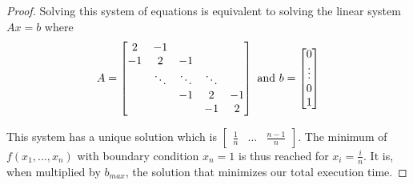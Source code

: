 \documentclass[a4paper,10pt]{article}
\begin{document}
\begin{proof}
  
  Solving this system of equations is equivalent to solving the linear system $Ax=b$ where
  \[ A = \begin{bmatrix}
    2       & -1 &  &  &  \\
    -1       & 2 & -1 &  &  \\
    & \ddots & \ddots & \ddots & \\
    & & -1 & 2 & -1 \\
           &  &  & -1 & 2
\end{bmatrix} \textup{ and } b = \begin{bmatrix} 0 \\ \vdots \\ 0 \\ 1 \end{bmatrix} \]
   
   This system has a unique solution which is $\begin{bmatrix} \frac{1}{n} & \dots & \frac{n-1}{n} \end{bmatrix}$.
   The minimum of $f(x_1,\dots,x_n)$ with boundary condition $x_n=1$ is thus reached for $x_i = \frac{i}{n}$.
   It is, when multiplied by $b_{max}$, the solution that minimizes our total execution time.
   \end{proof}
   
\end{document}

